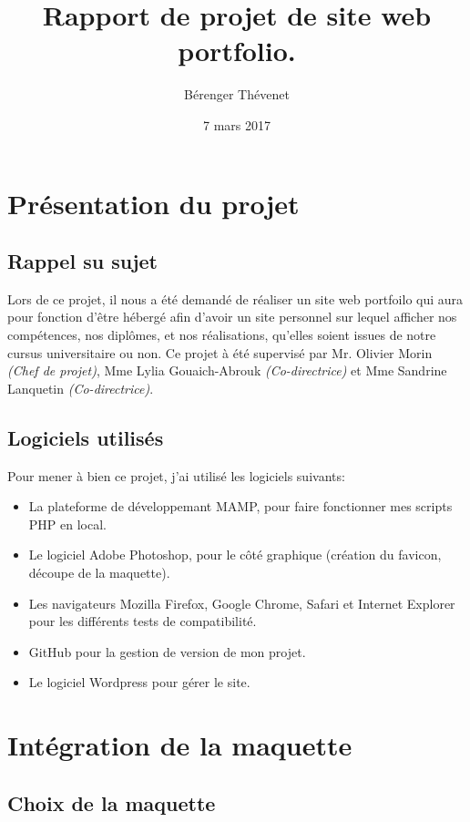 \documentclass{article}
\title{Rapport de projet de site web portfolio.}
\author{Bérenger Thévenet}
\date{7 mars 2017}
\begin{document}
\maketitle
\tableofcontents
\newpage
\section{Présentation du projet}
\subsection{Rappel su sujet}

Lors de ce projet, il nous a été demandé de réaliser un site web portfoilo qui aura pour fonction d'être hébergé afin d'avoir un site personnel sur lequel afficher nos compétences, nos diplômes, et nos réalisations, qu'elles soient issues de notre cursus universitaire ou non. Ce projet à été supervisé par Mr. Olivier Morin \textit{(Chef de projet)}, Mme Lylia Gouaich-Abrouk \textit{(Co-directrice)} et Mme Sandrine Lanquetin \textit{(Co-directrice)}.

\subsection{Logiciels utilisés}
Pour mener à bien ce projet, j'ai utilisé les logiciels suivants:
\begin{itemize}
    \item La plateforme de développemant MAMP, pour faire fonctionner mes scripts PHP en local.
    \item Le logiciel Adobe Photoshop, pour le côté graphique (création du favicon, découpe de la maquette).
    \item Les navigateurs Mozilla Firefox, Google Chrome, Safari et Internet Explorer pour les différents tests de compatibilité.
    \item GitHub pour la gestion de version de mon projet.
    \item Le logiciel Wordpress pour gérer le site.

\end{itemize}


\section{Intégration de la maquette}
\subsection{Choix de la maquette}
\end{document}
